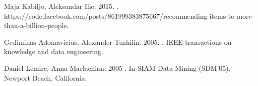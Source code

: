 \begin{thebibliography}{10}
Maja Kabiljo, Aleksandar Ilic. 2015.
.
\newblock https://code.facebook.com/posts/861999383875667/recommending-items-to-more-than-a-billion-people.

Gediminas Adomavicius, Alexander Tuzhilin. 2005.
.
\newblock  IEEE transactions on knowledge and data engineering.

Daniel Lemire, Anna Maclachlan. 2005
.
\newblock In SIAM Data Mining (SDM'05), Newport Beach, California.

\end{thebibliography}
